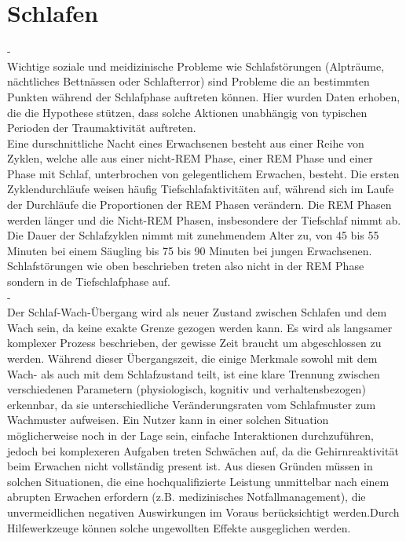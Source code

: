 \section{Schlafen}\label{sec:relatedWork.schlafen}

- \cite{broughton1968sleep}\\
Wichtige soziale und meidizinische Probleme wie Schlafstörungen (Alpträume, nächtliches Bettnässen oder Schlafterror) sind Probleme die an bestimmten Punkten während der Schlafphase auftreten können. Hier wurden Daten erhoben, die die Hypothese stützen, dass solche Aktionen unabhängig von typischen Perioden der Traumaktivität auftreten.\\
Eine durschnittliche Nacht eines Erwachsenen besteht aus einer Reihe von Zyklen, welche alle aus einer nicht-REM Phase, einer REM Phase und einer Phase mit Schlaf, unterbrochen von gelegentlichem Erwachen, besteht. Die ersten Zyklendurchläufe weisen häufig Tiefschlafaktivitäten auf, während sich im Laufe der Durchläufe die Proportionen der REM Phasen verändern. Die REM Phasen werden länger und die Nicht-REM Phasen, insbesondere der Tiefschlaf nimmt ab. Die Dauer der Schlafzyklen nimmt mit zunehmendem Alter zu, von 45 bis 55 Minuten bei einem Säugling bis 75 bis 90 Minuten bei jungen Erwachsenen.\\
Schlafstörungen wie oben beschrieben treten also nicht in der REM Phase sondern in de Tiefschlafphase auf.\\%

- \cite{ferrara2000sleep}\\
Der Schlaf-Wach-Übergang wird als neuer Zustand zwischen Schlafen und dem Wach sein, da keine exakte Grenze gezogen werden kann. Es wird als langsamer komplexer Prozess beschrieben, der gewisse Zeit braucht um abgeschlossen zu werden. Während dieser Übergangszeit, die einige Merkmale sowohl mit dem Wach- als auch mit dem Schlafzustand teilt, ist eine klare Trennung zwischen verschiedenen Parametern (physiologisch, kognitiv und verhaltensbezogen) erkennbar, da sie unterschiedliche Veränderungsraten vom Schlafmuster zum Wachmuster aufweisen. Ein Nutzer kann in einer solchen Situation möglicherweise noch in der Lage sein, einfache Interaktionen durchzuführen, jedoch bei komplexeren Aufgaben treten Schwächen auf, da die Gehirnreaktivität beim Erwachen nicht vollständig present ist. Aus diesen Gründen müssen in solchen Situationen, die eine hochqualifizierte Leistung unmittelbar nach einem abrupten Erwachen erfordern (z.B. medizinisches Notfallmanagement), die unvermeidlichen negativen Auswirkungen im Voraus berücksichtigt werden.Durch Hilfewerkzeuge können solche ungewollten Effekte ausgeglichen werden.\\


